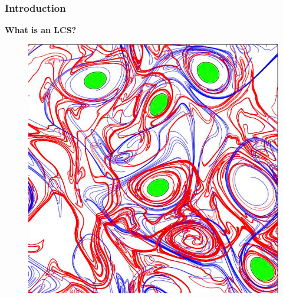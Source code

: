 \documentclass[../presentation.tex]{subfiles}
\begin{document}

\begin{frame}
  \frametitle{Introduction}

  \textbf{What is an LCS?}
  
  \begin{figure}[H]
    \centering
    \includegraphics[width=0.6\linewidth]{images/figure1.png}
  \end{figure}
\end{frame}
\end{document}
